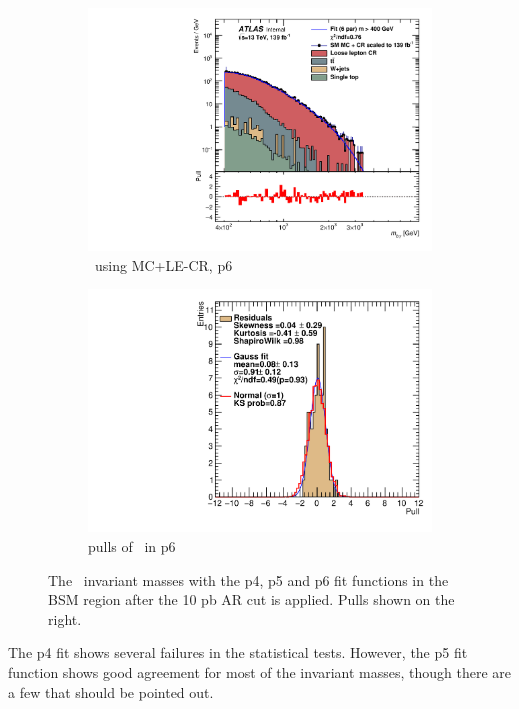 \begin{figure}[H]
\begin{subfigure}[h]{0.38\linewidth}
    \includegraphics[scale=0.3]{figs/ch6/fit/variable_nosmooth/p6/10PB/output_SMMCplusCR_Mbg_p6.pdf}%
    \caption{\mbph \ using MC+LE-CR, p6}
    \end{subfigure}
    \hfill
    \begin{subfigure}[h]{0.4\linewidth}
    \includegraphics[scale=0.32]{figs/ch6/fit/variable_nosmooth/p6/10PB/pull_SMMCplusCR_Mbg_p6.pdf}%
    \caption{pulls of \mbph \ in p6}
    \end{subfigure}
    \hfill
    \caption{The \mbph \ invariant masses with the p4, p5 and p6 fit functions in the BSM region after the 10 pb AR cut is applied. Pulls shown on the right.}
\label{fig:mbg-fit-pulls}
\end{figure}

\newpage

The p4 fit shows several failures in the statistical tests. However, the p5 fit function shows good agreement for most of the invariant masses, though there 
are a few that should be pointed out. 

